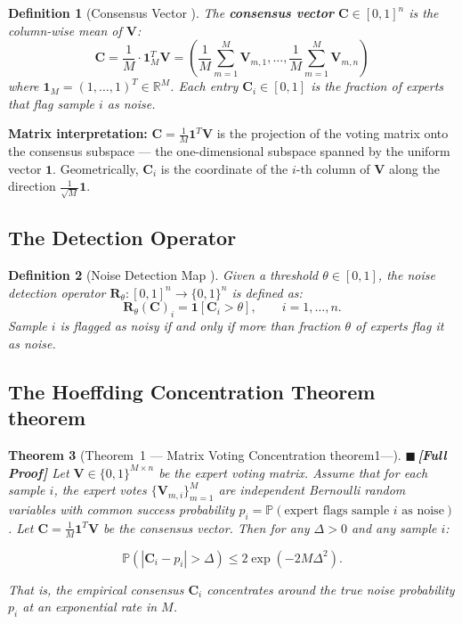 \documentclass[12pt,a4paper]{article}
\newtheorem{theorem}{Theorem}[section]
\newtheorem{definition}[theorem]{Definition}
\theoremstyle{definition}
\newcommand{\rigorFull}{{\color{rigorcolor}$\blacksquare$\,\textbf{[Full Proof]}}}
\newcommand{\R}{\mathbb{R}}
\newcommand{\Pbb}{\mathbb{P}}
\newcommand{\ind}[1]{\mathbf{1}[#1]}
\newcommand{\abs}[1]{\left|#1\right|}
\newcommand{\ones}{\mathbf{1}}
\newcommand{\mat}[1]{\mathbf{#1}}
\begin{document}
\begin{definition}[Consensus Vector ]\label{def:consensus_vector}
The \textbf{consensus vector} $\mat{C} \in [0,1]^n$ is the column-wise mean of $\mat{V}$:
\begin{equation}\label{eq:consensus_vector}
    \boxed{\mat{C} = \frac{1}{M} \cdot \ones_M^T \mat{V} = \left(\frac{1}{M}\sum_{m=1}^{M} \mat{V}_{m,1}, \ldots, \frac{1}{M}\sum_{m=1}^{M} \mat{V}_{m,n}\right)}
\end{equation}
where $\ones_M = (1, \ldots, 1)^T \in \R^M$. Each entry $\mat{C}_i \in [0,1]$ is the 
fraction of experts that flag sample $i$ as noise.
\end{definition}

\textbf{Matrix interpretation:} $\mat{C} = \frac{1}{M}\ones^T \mat{V}$ is the projection 
of the voting matrix onto the consensus subspace — the one-dimensional subspace spanned 
by the uniform vector $\ones$. Geometrically, $\mat{C}_i$ is the coordinate of the 
$i$-th column of $\mat{V}$ along the direction $\frac{1}{\sqrt{M}}\ones$.

\subsection{The Detection Operator }

\begin{definition}[Noise Detection Map ]\label{def:detection_map}
Given a threshold $\theta \in [0,1]$, the noise detection operator 
$\mat{R}_\theta: [0,1]^n \to \{0,1\}^n$ is defined as:
\begin{equation}\label{eq:detection_operator}
    \boxed{\mat{R}_\theta(\mat{C})_i = \ind{\mat{C}_i > \theta}, \qquad i = 1, \ldots, n.}
\end{equation}
Sample $i$ is flagged as noisy if and only if more than fraction $\theta$ of experts 
flag it as noise.
\end{definition}

\subsection{The Hoeffding Concentration Theorem theorem}

\begin{theorem}[Theorem~1 — Matrix Voting Concentration theorem1---]\label{thm:noise_concentration}
\rigorFull
Let $\mat{V} \in \{0,1\}^{M \times n}$ be the expert voting matrix. Assume that for 
each sample $i$, the expert votes $\{\mat{V}_{m,i}\}_{m=1}^{M}$ are independent 
Bernoulli random variables with common success probability $p_i = \Pbb(\text{expert 
flags sample } i \text{ as noise})$. Let $\mat{C} = \frac{1}{M}\ones^T \mat{V}$ be 
the consensus vector. Then for any $\Delta > 0$ and any sample $i$:

\begin{equation}\label{eq:thm1_hoeffding}
    \Pbb\left(\abs{\mat{C}_i - p_i} > \Delta\right) \leq 2\exp\!\left(-2M\Delta^2\right).
\end{equation}

That is, the empirical consensus $\mat{C}_i$ concentrates around the true noise 
probability $p_i$ at an exponential rate in $M$.
\end{theorem}
\end{document}
